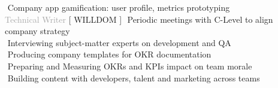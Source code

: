\begin{cvtable}
{     \textperiodcentered $ $ Company app gamification: user profile, metrics prototyping
     \\
} 
% 
% 
{\textcolor{darkgray}{%
    Technical Writer
    }}%
{[ {W\scriptsize ILL}{D\scriptsize OM} ]}%
{%
    \textperiodcentered $ $ Periodic meetings with C-Level to align company strategy  \\
    \textperiodcentered $ $ Interviewing subject-matter experts on development and QA \\
    \textperiodcentered $ $ Producing company templates for OKR documentation \\
    \textperiodcentered $ $ Preparing and Measuring OKRs and KPIs impact on team morale \\
    \textperiodcentered $ $ Building content with developers, talent and marketing across teams 
} 


\end{cvtable}
